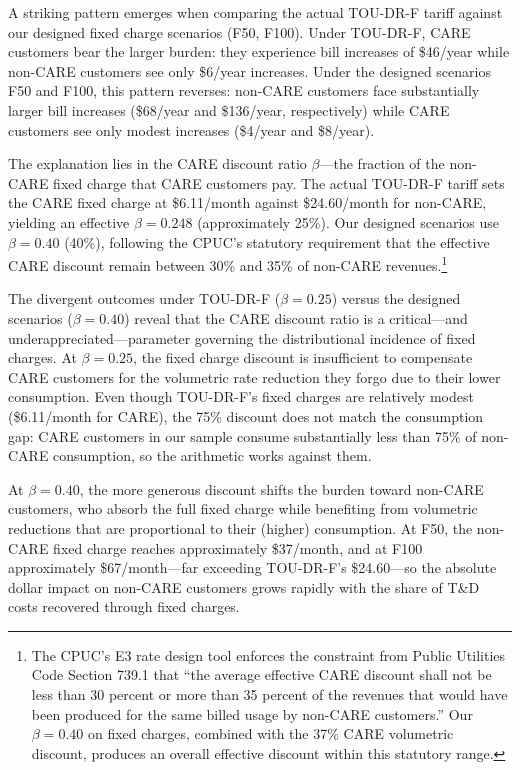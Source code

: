 \documentclass[12pt]{article}
\begin{document}
A striking pattern emerges when comparing the actual TOU-DR-F tariff against our designed fixed charge scenarios (F50, F100). Under TOU-DR-F, CARE customers bear the larger burden: they experience bill increases of \$46/year while non-CARE customers see only \$6/year increases. Under the designed scenarios F50 and F100, this pattern reverses: non-CARE customers face substantially larger bill increases (\$68/year and \$136/year, respectively) while CARE customers see only modest increases (\$4/year and \$8/year).

The explanation lies in the CARE discount ratio $\beta$---the fraction of the non-CARE fixed charge that CARE customers pay. The actual TOU-DR-F tariff sets the CARE fixed charge at \$6.11/month against \$24.60/month for non-CARE, yielding an effective $\beta = 0.248$ (approximately 25\%). Our designed scenarios use $\beta = 0.40$ (40\%), following the CPUC's statutory requirement that the effective CARE discount remain between 30\% and 35\% of non-CARE revenues.\footnote{The CPUC's E3 rate design tool enforces the constraint from Public Utilities Code Section 739.1 that ``the average effective CARE discount shall not be less than 30 percent or more than 35 percent of the revenues that would have been produced for the same billed usage by non-CARE customers.'' Our $\beta = 0.40$ on fixed charges, combined with the 37\% CARE volumetric discount, produces an overall effective discount within this statutory range.}

The divergent outcomes under TOU-DR-F ($\beta = 0.25$) versus the designed scenarios ($\beta = 0.40$) reveal that the CARE discount ratio is a critical---and underappreciated---parameter governing the distributional incidence of fixed charges. At $\beta = 0.25$, the fixed charge discount is insufficient to compensate CARE customers for the volumetric rate reduction they forgo due to their lower consumption. Even though TOU-DR-F's fixed charges are relatively modest (\$6.11/month for CARE), the 75\% discount does not match the consumption gap: CARE customers in our sample consume substantially less than 75\% of non-CARE consumption, so the arithmetic works against them.

At $\beta = 0.40$, the more generous discount shifts the burden toward non-CARE customers, who absorb the full fixed charge while benefiting from volumetric reductions that are proportional to their (higher) consumption. At F50, the non-CARE fixed charge reaches approximately \$37/month, and at F100 approximately \$67/month---far exceeding TOU-DR-F's \$24.60---so the absolute dollar impact on non-CARE customers grows rapidly with the share of T\&D costs recovered through fixed charges.
\end{document}
